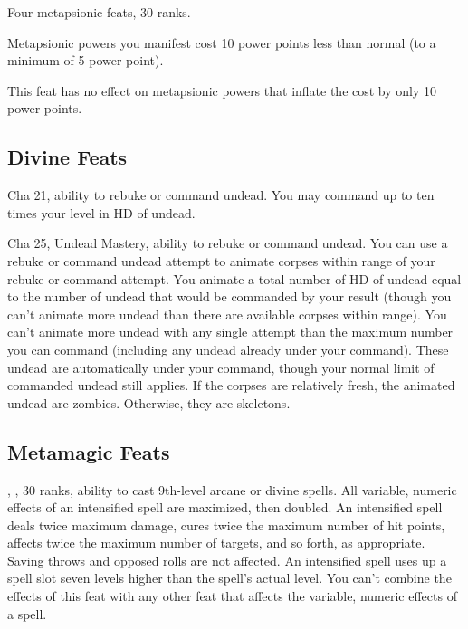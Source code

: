 {Four metapsionic feats,  30 ranks.}
{Metapsionic powers you manifest cost 10 power points less than normal (to a minimum of 5 power point).

This feat has no effect on metapsionic powers that inflate the cost by only 10 power points.}




\subsection{Divine Feats}
{Cha 21, ability to rebuke or command undead.}
{You may command up to ten times your level in HD of undead.}

{Cha 25, Undead Mastery, ability to rebuke or command undead.}
{You can use a rebuke or command undead attempt to animate corpses within range of your rebuke or command attempt. You animate a total number of HD of undead equal to the number of undead that would be commanded by your result (though you can’t animate more undead than there are available corpses within range). You can’t animate more undead with any single attempt than the maximum number you can command (including any undead already under your command). These undead are automatically under your command, though your normal limit of commanded undead still applies. If the corpses are relatively fresh, the animated undead are zombies. Otherwise, they are skeletons.}




\subsection{Metamagic Feats}
{, ,  30 ranks, ability to cast 9th-level arcane or divine spells.}
{All variable, numeric effects of an intensified spell are maximized, then doubled. An intensified spell deals twice maximum damage, cures twice the maximum number of hit points, affects twice the maximum number of targets, and so forth, as appropriate. Saving throws and opposed rolls are not affected. An intensified spell uses up a spell slot seven levels higher than the spell's actual level. You can't combine the effects of this feat with any other feat that affects the variable, numeric effects of a spell.}


\clearpage


\clearpage

